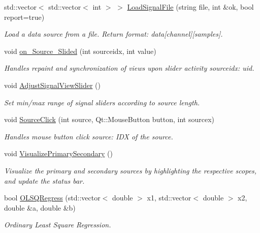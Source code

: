 \begin{CompactItemize}
\item 
std::vector$<$ std::vector$<$ int $>$ $>$ \hyperlink{class_main_window_d5a267c6b9f511f4f128fdf465fe935b}{LoadSignalFile} (string file, int \&ok, bool report=true)
\begin{CompactList}\small\item\em Load a data source from a file. Return format: data\mbox{[}channel\mbox{]}\mbox{[}samples\mbox{]}. \item\end{CompactList}\item 
void \hyperlink{class_main_window_dd08c6c56c319c5462f723df4716917a}{on\_\-Source\_\-Slided} (int sourceidx, int value)
\begin{CompactList}\small\item\em Handles repaint and synchronization of views upon slider activity sourceidx: uid. \item\end{CompactList}\item 
void \hyperlink{class_main_window_ef0316ae76a2a44a6d82e7b712e0d32a}{AdjustSignalViewSlider} ()
\begin{CompactList}\small\item\em Set min/max range of signal sliders according to source length. \item\end{CompactList}\item 
void \hyperlink{class_main_window_ac9949b31bd3f5977f19160ccbd26415}{SourceClick} (int source, Qt::MouseButton button, int sourcex)
\begin{CompactList}\small\item\em Handles mouse button click source: IDX of the source. \item\end{CompactList}\item 
void \hyperlink{class_main_window_fe5095ab6bf2691a33c51ee67121a867}{VisualizePrimarySecondary} ()
\begin{CompactList}\small\item\em Visualize the primary and secondary sources by highlighting the respective scopes, and update the status bar. \item\end{CompactList}\item 
bool \hyperlink{class_main_window_20833bb123708ce4d1bd33b22de1f057}{OLSQRegress} (std::vector$<$ double $>$ x1, std::vector$<$ double $>$ x2, double \&a, double \&b)
\begin{CompactList}\small\item\em Ordinary Least Square Regression. \item\end{CompactList}\item 

\end{CompactItemize}
